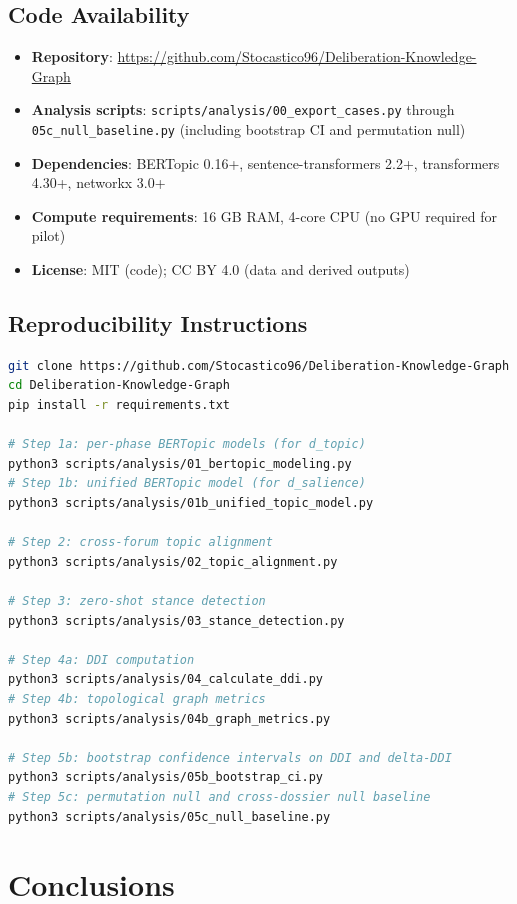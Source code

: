 \documentclass[sigconf,natbib]{acmart}
\begin{document}
\subsection{Code Availability}
\begin{itemize}
  \item \textbf{Repository}: \url{https://github.com/Stocastico96/Deliberation-Knowledge-Graph}
  \item \textbf{Analysis scripts}: \texttt{scripts/analysis/00\_export\_cases.py} through \texttt{05c\_null\_baseline.py} (including bootstrap CI and permutation null)
  \item \textbf{Dependencies}: BERTopic 0.16+, sentence-transformers 2.2+, transformers 4.30+, networkx 3.0+
  \item \textbf{Compute requirements}: 16 GB RAM, 4-core CPU (no GPU required for pilot)
  \item \textbf{License}: MIT (code); CC BY 4.0 (data and derived outputs)
\end{itemize}

\subsection{Reproducibility Instructions}
\begin{lstlisting}[language=bash, basicstyle=\small\ttfamily]
git clone https://github.com/Stocastico96/Deliberation-Knowledge-Graph
cd Deliberation-Knowledge-Graph
pip install -r requirements.txt

# Step 1a: per-phase BERTopic models (for d_topic)
python3 scripts/analysis/01_bertopic_modeling.py
# Step 1b: unified BERTopic model (for d_salience)
python3 scripts/analysis/01b_unified_topic_model.py

# Step 2: cross-forum topic alignment
python3 scripts/analysis/02_topic_alignment.py

# Step 3: zero-shot stance detection
python3 scripts/analysis/03_stance_detection.py

# Step 4a: DDI computation
python3 scripts/analysis/04_calculate_ddi.py
# Step 4b: topological graph metrics
python3 scripts/analysis/04b_graph_metrics.py

# Step 5b: bootstrap confidence intervals on DDI and delta-DDI
python3 scripts/analysis/05b_bootstrap_ci.py
# Step 5c: permutation null and cross-dossier null baseline
python3 scripts/analysis/05c_null_baseline.py
\end{lstlisting}

\section{Conclusions}
\end{document}
